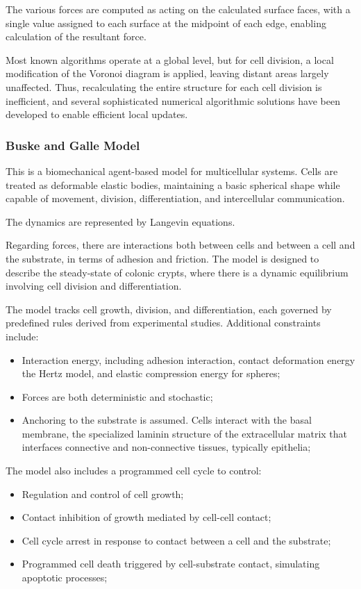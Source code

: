 The various forces are computed as acting on the calculated surface faces, with a single value assigned to each surface at the midpoint of each edge, enabling calculation of the resultant force.

Most known algorithms operate at a global level, but for cell division, a local modification of the Voronoi diagram is applied, leaving distant areas largely unaffected. Thus, recalculating the entire structure for each cell division is inefficient, and several sophisticated numerical algorithmic solutions have been developed to enable efficient local updates.

\subsubsection{Buske and Galle Model}
This is a biomechanical agent-based model for multicellular systems. Cells are treated as deformable elastic bodies, maintaining a basic spherical shape while capable of movement, division, differentiation, and intercellular communication.

The dynamics are represented by Langevin equations.

Regarding forces, there are interactions both between cells and between a cell and the substrate, in terms of adhesion and friction. The model is designed to describe the steady-state of colonic crypts, where there is a dynamic equilibrium involving cell division and differentiation.

The model tracks cell growth, division, and differentiation, each governed by predefined rules derived from experimental studies. Additional constraints include:
\begin{itemize}
    \item Interaction energy, including adhesion interaction, contact deformation energy the Hertz model, and elastic compression energy for spheres;
    \item Forces are both deterministic and stochastic;
    \item Anchoring to the substrate is assumed. Cells interact with the basal membrane, the specialized laminin structure of the extracellular matrix that interfaces connective and non-connective tissues, typically epithelia;
\end{itemize}

The model also includes a programmed cell cycle to control:
\begin{itemize}
    \item Regulation and control of cell growth;
    \item Contact inhibition of growth mediated by cell-cell contact;
    \item Cell cycle arrest in response to contact between a cell and the substrate;
    \item Programmed cell death triggered by cell-substrate contact, simulating apoptotic processes;
\end{itemize}
